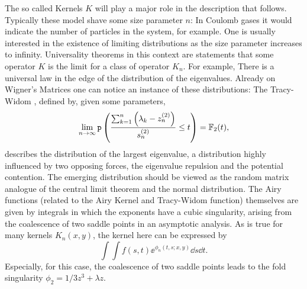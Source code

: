 The so called Kernels $K$ will play a major role in the description that follows. Typically these model shave some size parameter $n$: In Coulomb gases it would indicate the number of particles in the system, for example. One is usually interested in the existence of limiting distributions as the size parameter increases to infinity. \cite{Tracy2006} Universality theorems in this context are statements that some operator $K$ is the limit for a class of operator $K_n$. For example, There is a universal law in the edge of the distribution of the eigenvalues. Already on Wigner's Matrices one can notice an instance of these distributions: The Tracy-Widom \cite{Tracy_1993}, defined by, given some parameters,
\begin{equation}
	\lim_{n\rightarrow \infty} \mathtt{p}\left( \frac{\sum_{k=1}^{n} \left( \lambda_k - z_n^{(2)}\right)}{s^{(2)}_n} \leq t \right) = \mathbb{F}_{2}(t),
	\label{Equation: Airy}
\end{equation}
describes the distribution of the largest eigenvalue, a distribution highly influenced by two opposing forces, the eigenvalue repulsion and the potential contention. The emerging distribution should be viewed as the random matrix analogue of the central limit theorem and the normal distribution. The Airy functions (related to the Airy Kernel and Tracy-Widom function) themselves are given by integrals in which the exponents have a cubic singularity, arising from the coalescence of two saddle points in an asymptotic analysis. As is true for many kernels $K_n(x,y)$, the kernel here can be expressed by
\begin{equation}
	\int \int f(s, t) \ee^{\phi_n(t,s;x,y)} \dd s \dd t.
\end{equation}
Especially, for this case, the coalescence of two saddle points leads to the fold singularity $\phi_2 = 1/3 z^3 + \lambda z$. 


